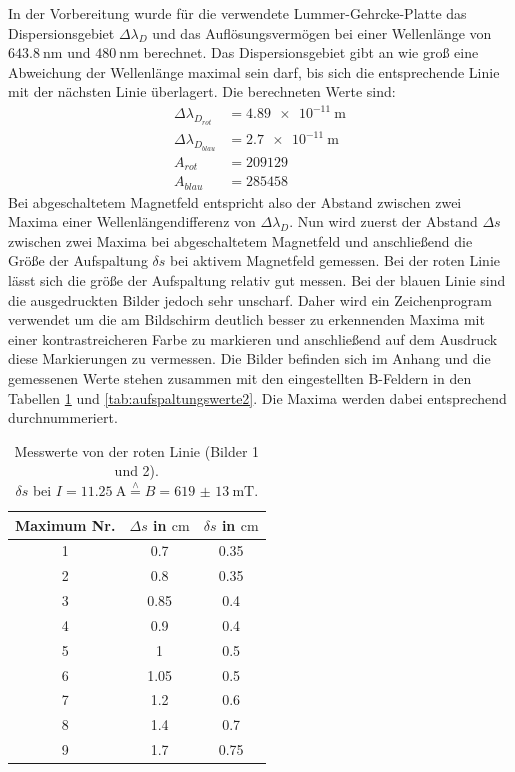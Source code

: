 \documentclass[
  bibliography=totoc,     %
  captions=tableheading,  %
  titlepage=firstiscover, %
]{scrartcl}
\begin{document}
\noindent
In der Vorbereitung wurde für die verwendete Lummer-Gehrcke-Platte das Dispersionsgebiet $\Delta\lambda_D$
und das Auflösungsvermögen bei einer Wellenlänge von $\SI{643.8}{\nano\meter}$ und
$\SI{480}{\nano\meter}$ berechnet. Das Dispersionsgebiet gibt an wie groß eine Abweichung
der Wellenlänge maximal sein darf, bis sich die entsprechende Linie mit der nächsten Linie überlagert.
Die berechneten Werte sind:
\begin{align*}
  \Delta\lambda_{D_{rot}} &= \SI{4.89e-11}{\meter} \\
  \Delta\lambda_{D_{blau}} &= \SI{2.7e-11}{\meter} \\
  A_{rot} &= 209129 \\
  A_{blau} &= 285458
\end{align*}
Bei abgeschaltetem Magnetfeld entspricht also der Abstand zwischen zwei Maxima einer
Wellenlängendifferenz von $\Delta\lambda_D$. Nun wird zuerst der Abstand $\Delta s$ zwischen
zwei Maxima bei abgeschaltetem Magnetfeld und anschließend die Größe
der Aufspaltung $\delta s$ bei aktivem Magnetfeld gemessen.
Bei der roten Linie lässt sich die größe der Aufspaltung relativ gut messen.
Bei der blauen Linie sind die ausgedruckten Bilder jedoch sehr unscharf. Daher
wird ein Zeichenprogram verwendet um die am Bildschirm deutlich besser zu erkennenden
Maxima mit einer kontrastreicheren Farbe zu markieren und anschließend auf dem Ausdruck
diese Markierungen zu vermessen.
\clearpage
\noindent
Die Bilder befinden sich im Anhang und die gemessenen Werte stehen zusammen mit den eingestellten
B-Feldern in den Tabellen \ref{tab:aufspaltungswerte1} und \ref{tab:aufspaltungswerte2}.
Die Maxima werden dabei entsprechend durchnummeriert.
\begin{table}[H]
  \centering
  \caption{Messwerte von der roten Linie (Bilder 1 und 2).\\ $\delta s$ bei $I=\SI{11.25}{\ampere}\stackrel{\wedge}{=}B=\SI{619(13)}{\milli\tesla}$.}
  \label{tab:aufspaltungswerte1}
  \begin{tabular}{c c c}
    \toprule
    Maximum Nr. & $\Delta s$ in $\si{\centi\meter}$ & $\delta s$ in $\si{\centi\meter}$ \\
    \midrule
     1 & 0.7  & 0.35 \\
     2 & 0.8  & 0.35 \\
     3 & 0.85 & 0.4  \\
     4 & 0.9  & 0.4  \\
     5 & 1    & 0.5  \\
     6 & 1.05 & 0.5  \\
     7 & 1.2  & 0.6  \\
     8 & 1.4  & 0.7  \\
     9 & 1.7  & 0.75 \\
    \bottomrule
  \end{tabular}
\end{table}
\end{document}

